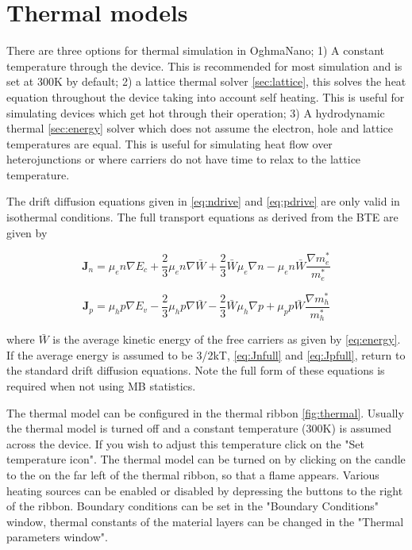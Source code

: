 \section{Thermal models}
There are three options for thermal simulation in OghmaNano; 1) A constant temperature through the device. This is recommended for most simulation and is set at 300K by default; 2) a lattice thermal solver \ref{sec:lattice}, this solves the heat equation throughout the device taking into account self heating.  This is useful for simulating devices which get hot through their operation; 3) A hydrodynamic thermal \ref{sec:energy} solver which does not assume the electron, hole and lattice temperatures are equal.  This is useful for simulating heat flow over heterojunctions or where carriers do not have time to relax to the lattice temperature.

The drift diffusion equations given in \ref{eq:ndrive} and \ref{eq:pdrive} are only valid in isothermal conditions.  The full transport equations as derived from the BTE \cite{Azoff} are given by

\begin{equation}
\label{eq:Jnfull}
 \textbf{J}_n = \mu_e n \nabla E_c +\frac{2}{3} \mu_e n \nabla \bar{W} + \frac{2}{3} \bar{W} \mu_e \nabla n - \mu_e n \bar{W} \frac{\nabla m^*_e}{m^*_e}
\end{equation}


\begin{equation}
\label{eq:Jpfull}
 \textbf{J}_p = \mu_h p \nabla E_v -\frac{2}{3} \mu_h p \nabla \bar{W} - \frac{2}{3} \bar{W} \mu_h \nabla p + \mu_p p \bar{W} \frac{\nabla m^*_h}{m^*_h}
\end{equation}

where $\bar{W}$ is the average kinetic energy of the free carriers as given by \ref{eq:energy}.  If the average energy is assumed to be 3/2kT, \ref{eq:Jnfull} and \ref{eq:Jpfull}, return to the standard drift diffusion equations. Note the full form of these equations is required when not using MB statistics.

The thermal model can be configured in the thermal ribbon \ref{fig:thermal}. Usually the thermal model is turned off and a constant temperature (300K) is assumed across the device. If you wish to adjust this temperature click on the "Set temperature icon".  The thermal model can be turned on by clicking on the candle to the on the far left of the thermal ribbon, so that a flame appears.  Various heating sources can be enabled or disabled by depressing the buttons to the right of the ribbon. Boundary conditions can be set in the "Boundary Conditions" window, thermal constants of the material layers can be changed in the "Thermal parameters window".

